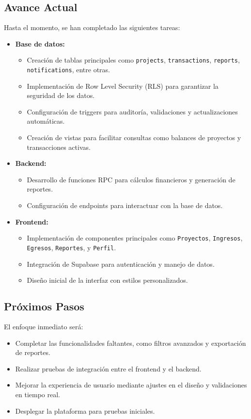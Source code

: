 \subsection*{Avance Actual}
Hasta el momento, se han completado las siguientes tareas:
\begin{itemize}
    \item \textbf{Base de datos:}
    \begin{itemize}
        \item Creación de tablas principales como \texttt{projects}, \texttt{transactions}, \texttt{reports}, \texttt{notifications}, entre otras.
        \item Implementación de Row Level Security (RLS) para garantizar la seguridad de los datos.
        \item Configuración de triggers para auditoría, validaciones y actualizaciones automáticas.
        \item Creación de vistas para facilitar consultas como balances de proyectos y transacciones activas.
    \end{itemize}
    \item \textbf{Backend:}
    \begin{itemize}
        \item Desarrollo de funciones RPC para cálculos financieros y generación de reportes.
        \item Configuración de endpoints para interactuar con la base de datos.
    \end{itemize}
    \item \textbf{Frontend:}
    \begin{itemize}
        \item Implementación de componentes principales como \texttt{Proyectos}, \texttt{Ingresos}, \texttt{Egresos}, \texttt{Reportes}, y \texttt{Perfil}.
        \item Integración de Supabase para autenticación y manejo de datos.
        \item Diseño inicial de la interfaz con estilos personalizados.
    \end{itemize}
\end{itemize}

\subsection*{Próximos Pasos}
El enfoque inmediato será:
\begin{itemize}
    \item Completar las funcionalidades faltantes, como filtros avanzados y exportación de reportes.
    \item Realizar pruebas de integración entre el frontend y el backend.
    \item Mejorar la experiencia de usuario mediante ajustes en el diseño y validaciones en tiempo real.
    \item Desplegar la plataforma para pruebas iniciales.
\end{itemize}